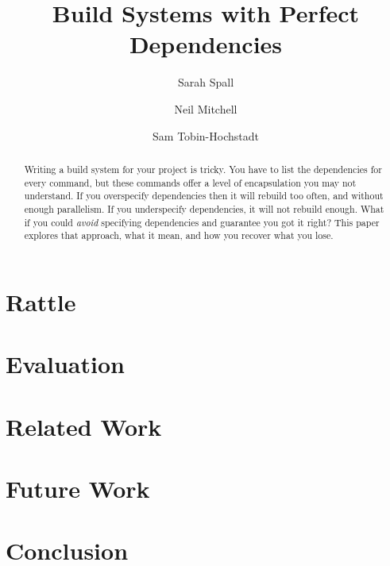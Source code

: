\documentclass[acmsmall]{acmart}
\begin{document}
\title{Build Systems with Perfect Dependencies}

\author{Sarah Spall}

\author{Neil Mitchell}

\author{Sam Tobin-Hochstadt}

\begin{abstract}
Writing a build system for your project is tricky. You have to list the dependencies for every command, but these commands offer a level of encapsulation you may not understand. If you overspecify dependencies then it will rebuild too often, and without enough parallelism. If you underspecify dependencies, it will not rebuild enough. What if you could \emph{avoid} specifying dependencies and guarantee you got it right? This paper explores that approach, what it mean, and how you recover what you lose.
\end{abstract}

\maketitle



\section{Rattle}

\section{Evaluation}

\section{Related Work}

\section{Future Work}

\section{Conclusion}
\end{document}
